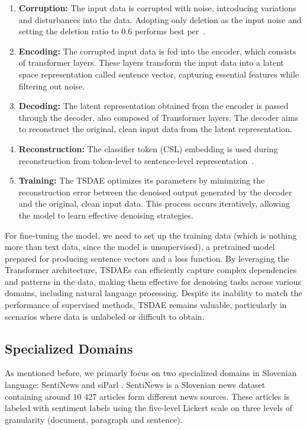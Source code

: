 \documentclass[fleqn,moreauthors,10pt]{ds_report}
\begin{document}
\begin{enumerate}
    \item \textbf{Corruption:} The input data is corrupted with noise, introducing variations and disturbances into the data. Adopting only deletion as the input noise and setting the deletion ratio to 0.6 performs best per~\cite{tsdae}.
    \item \textbf{Encoding:} The corrupted input data is fed into the encoder, which consists of transformer layers. These layers transform the input data into a latent space representation called sentence vector, capturing essential features while filtering out noise.
    \item \textbf{Decoding:} The latent representation obtained from the encoder is passed through the decoder, also composed of Transformer layers. The decoder aims to reconstruct the original, clean input data from the latent representation.
    \item \textbf{Reconstruction:} The classifier token (CSL) embedding is used during reconstruction from token-level to sentence-level representation~\cite{pinecone_2021}.
    \item \textbf{Training:} The TSDAE optimizes its parameters by minimizing the reconstruction error between the denoised output generated by the decoder and the original, clean input data. This process occurs iteratively, allowing the model to learn effective denoising strategies.
\end{enumerate}

For fine-tuning the model, we need to set up the training data (which is nothing more than text data, since the model is unsupervised), a pretrained model prepared for producing sentence vectors and a loss function.
By leveraging the Transformer architecture, TSDAEs can efficiently capture complex dependencies and patterns in the data, making them effective for denoising tasks across various domains, including natural language processing. 
Despite its inability to match the performance of supervised methods, TSDAE remains valuable, particularly in scenarios where data is unlabeled or difficult to obtain.

\subsection*{Specialized Domains}
As mentioned before, we primarly focus on two specialized domains in Slovenian language: SentiNews \cite{SentiNews} and siParl \cite{siParl}.
SentiNews is a Slovenian news dataset containing around 10 427 articles form different news sources.
These articles is labeled with sentiment labels using the five-level Lickert scale on three levels of granularity (document, paragraph and sentence).
\end{document}
